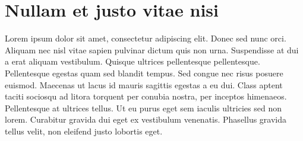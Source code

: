 \section{Nullam et justo vitae nisi}
\label{sec:problem}

Lorem ipsum dolor sit amet, consectetur adipiscing elit. Donec sed nunc orci. Aliquam nec nisl vitae sapien pulvinar dictum quis non urna. Suspendisse at dui a erat aliquam vestibulum. Quisque ultrices pellentesque pellentesque. Pellentesque egestas quam sed blandit tempus. Sed congue nec risus posuere euismod. Maecenas ut lacus id mauris sagittis egestas a eu dui. Class aptent taciti sociosqu ad litora torquent per conubia nostra, per inceptos himenaeos. Pellentesque at ultrices tellus. Ut eu purus eget sem iaculis ultricies sed non lorem. Curabitur gravida dui eget ex vestibulum venenatis. Phasellus gravida tellus velit, non eleifend justo lobortis eget.


